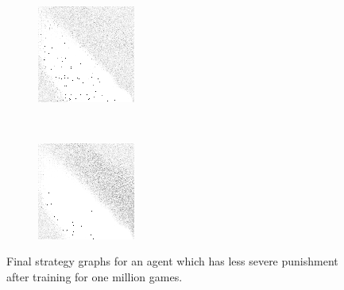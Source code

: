 \begin{figure}
\begin{subfigure}[t]{0.22\textwidth}
		\caption{\peggingmaxavggained}
	\end{subfigure}
	~
	\begin{subfigure}[t]{0.22\textwidth}
		\includegraphics[width=\textwidth]{images/findings/experiments/punishment/strategies_peggingmaxmedgained.png}
		\caption{\peggingmaxmedgained}
	\end{subfigure}
	~
	\begin{subfigure}[t]{0.22\textwidth}
		\includegraphics[width=\textwidth]{images/findings/experiments/punishment/strategies_peggingminavggiven.png}
		\caption{\peggingminavggiven}
	\end{subfigure}

\caption{
	Final strategy graphs for an agent which has less severe punishment
	after training for one million games.
}
\label{fig:findings-expts-punish-strats}
\end{figure}
